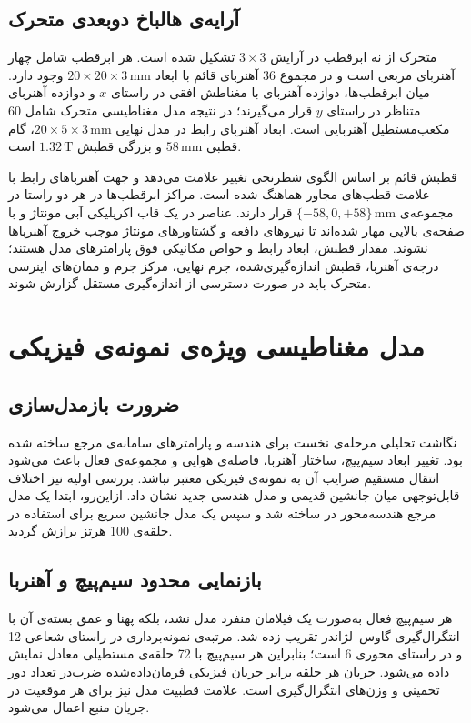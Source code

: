 \subsection{آرایه‌ی هالباخ دوبعدی متحرک}

متحرک از نه ابرقطب در آرایش $3\times3$ تشکیل شده است. هر ابرقطب شامل چهار آهنربای مربعی است و در مجموع 36 آهنربای قائم با ابعاد $20\times20\times3\,\mathrm{mm}$ وجود دارد. میان ابرقطب‌ها، دوازده آهنربای با مغناطش افقی در راستای $x$ و دوازده آهنربای متناظر در راستای $y$ قرار می‌گیرند؛ در نتیجه مدل مغناطیسی متحرک شامل 60 مکعب‌مستطیل آهنربایی است. ابعاد آهنربای رابط در مدل نهایی $20\times5\times3\,\mathrm{mm}$، گام قطبی $58\,\mathrm{mm}$ و بزرگی قطبش $1.32\,\mathrm T$ است.

قطبش قائم بر اساس الگوی شطرنجی تغییر علامت می‌دهد و جهت آهنرباهای رابط با علامت قطب‌های مجاور هماهنگ شده است. مراکز ابرقطب‌ها در هر دو راستا در مجموعه‌ی $\{-58,0,+58\}\,\mathrm{mm}$ قرار دارند. عناصر در یک قاب اکریلیکی آبی مونتاژ و با صفحه‌ی بالایی مهار شده‌اند تا نیروهای دافعه و گشتاورهای مونتاژ موجب خروج آهنرباها نشوند. مقدار قطبش، ابعاد رابط و خواص مکانیکی فوق پارامترهای مدل هستند؛ درجه‌ی آهنربا، قطبش اندازه‌گیری‌شده، جرم نهایی، مرکز جرم و ممان‌های اینرسی متحرک باید در صورت دسترسی از اندازه‌گیری مستقل گزارش شوند.

\section{مدل مغناطیسی ویژه‌ی نمونه‌ی فیزیکی}
\label{sec:method-physical-magnetic-model}

\subsection{ضرورت بازمدل‌سازی}

نگاشت تحلیلی مرحله‌ی نخست برای هندسه و پارامترهای سامانه‌ی مرجع ساخته شده بود. تغییر ابعاد سیم‌پیچ، ساختار آهنربا، فاصله‌ی هوایی و مجموعه‌ی فعال باعث می‌شود انتقال مستقیم ضرایب آن به نمونه‌ی فیزیکی معتبر نباشد. بررسی اولیه نیز اختلاف قابل‌توجهی میان جانشین قدیمی و مدل هندسی جدید نشان داد. ازاین‌رو، ابتدا یک مدل مرجع هندسه‌محور در  \cite{ortnerMagpylibFreePython2020} ساخته شد و سپس یک مدل جانشین سریع برای استفاده در حلقه‌ی 100 هرتز برازش گردید.

\subsection{بازنمایی محدود سیم‌پیچ و آهنربا}

هر سیم‌پیچ فعال به‌صورت یک فیلامان منفرد مدل نشد، بلکه پهنا و عمق بسته‌ی آن با انتگرال‌گیری گاوس--لژاندر تقریب زده شد. مرتبه‌ی نمونه‌برداری در راستای شعاعی 12 و در راستای محوری 6 است؛ بنابراین هر سیم‌پیچ با 72 حلقه‌ی مستطیلی معادل نمایش داده می‌شود. جریان هر حلقه برابر جریان فیزیکی فرمان‌داده‌شده ضرب‌در تعداد دور تخمینی و وزن‌های انتگرال‌گیری است. علامت قطبیت مدل نیز برای هر موقعیت در جریان منبع اعمال می‌شود.

